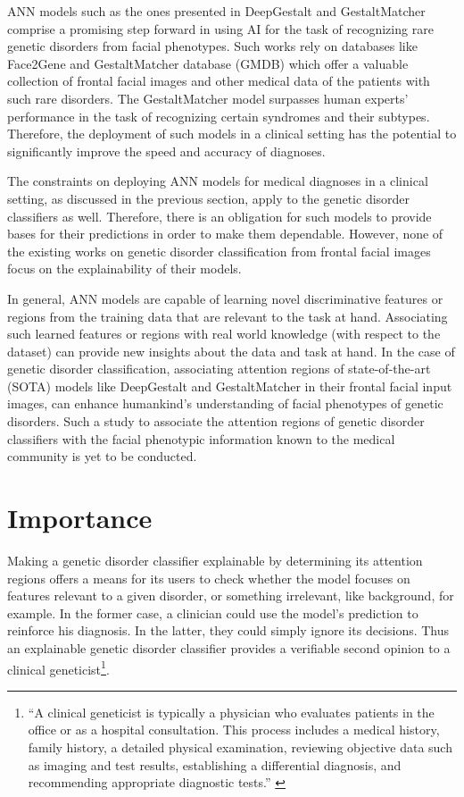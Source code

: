 \documentclass[../report.tex]{subfiles}
\begin{document}
    ANN models such as the ones presented in DeepGestalt \cite{Gurovich2019} and GestaltMatcher comprise a promising step forward in using AI for the task of recognizing rare genetic disorders from facial phenotypes. Such works rely on databases like Face2Gene \cite{face2gene} and GestaltMatcher database (GMDB) \cite{gmdb}  which offer a valuable collection of frontal facial images and other medical data of the patients with such rare disorders. The GestaltMatcher model surpasses human experts' performance in the task of recognizing certain syndromes and their subtypes. Therefore, the deployment of such models in a clinical setting has the potential to significantly improve the speed and accuracy of diagnoses.
    
    The constraints on deploying ANN models for medical diagnoses in a clinical setting, as discussed in the previous section, apply to the genetic disorder classifiers as well. Therefore, there is an obligation for such models to provide bases for their predictions in order to make them dependable. However, none of the existing works on genetic disorder classification from frontal facial images focus on the explainability of their models.
    
    In general, ANN models are capable of learning novel discriminative features or regions from the training data that are relevant to the task at hand. Associating such learned features or regions with real world knowledge (with respect to the dataset) can provide new insights about the data and task at hand. In the case of genetic disorder classification, associating attention regions of state-of-the-art (SOTA) models like DeepGestalt \cite{Gurovich2019} and GestaltMatcher in their frontal facial input images, can enhance humankind's understanding of facial phenotypes of genetic disorders. Such a study to associate the attention regions of genetic disorder classifiers with the facial phenotypic information known to the medical community is yet to be conducted.
    
    \section{Importance} \label{sec_importance}
    \noindent
    Making a genetic disorder classifier explainable by determining its attention regions offers a means for its users to check whether the model focuses on features relevant to a given disorder, or something irrelevant, like background, for example. In the former case, a clinician could use the model's prediction to reinforce his diagnosis. In the latter, they could simply ignore its decisions. Thus an explainable genetic disorder classifier provides a verifiable second opinion to a clinical geneticist\footnote{\enquote{A clinical geneticist is typically a physician who evaluates patients in the office or as a hospital consultation. This process includes a medical history, family history, a detailed physical examination, reviewing objective data such as imaging and test results, establishing a differential diagnosis, and recommending appropriate diagnostic tests.} \cite{wiki_clin_gen}}.
    
\end{document}
